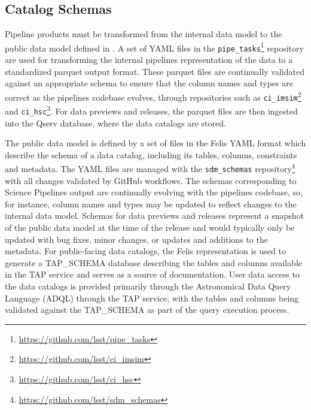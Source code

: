 \subsection{Catalog Schemas}
\label{sec:schemas}

Pipeline products must be transformed from the internal data model to the public data model defined in \citet{LSE-163}.
A set of YAML files in the \texttt{pipe\_tasks}\footnote{\url{https://github.com/lsst/pipe\_tasks}} repository are used for transforming the internal pipelines representation of the data to a standardized parquet output format.
These parquet files are continually validated against an appropriate schema to ensure that the column names and types are correct as the pipelines codebase evolves, through repositories such as \texttt{ci\_imsim}\footnote{\url{https://github.com/lsst/ci\_imsim}} and \texttt{ci\_hsc}\footnote{\url{https://github.com/lsst/ci\_hsc}}.
For data previews and releases, the parquet files are then ingested into the Qserv database, where the data catalogs are stored.

The public data model is defined by a set of files in the Felis\citep{2024arXiv241209721M} YAML format which describe the schema of a data catalog, including its tables, columns, constraints and metadata.
The YAML files are managed with the \texttt{sdm\_schemas} repository\footnote{\url{https://github.com/lsst/sdm\_schemas}} with all changes validated by GitHub workflows.
The schemas corresponding to Science Pipelines output are continually evolving with the pipelines codebase, so, for instance, column names and types may be updated to reflect changes to the internal data model.
Schemas for data previews and releases represent a snapshot of the public data model at the time of the release and would typically only be updated with bug fixes, minor changes, or updates and additions to the metadata.
For public-facing data catalogs, the Felis representation is used to generate a TAP\_SCHEMA database describing the tables and columns available in the TAP service \citep{2019ivoa.spec.0927D} and serves as a source of documentation.
User data access to the data catalogs is provided primarily through the Astronomical Data Query Language (ADQL) through the TAP service, with the tables and columns being validated against the TAP\_SCHEMA as part of the query execution process.
